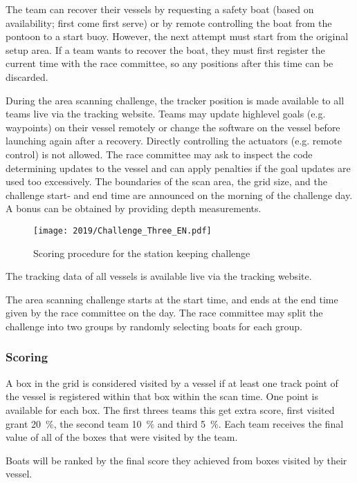 \documentclass[12pt]{article}
\begin{document}
The team can recover their vessels by requesting a safety boat (based on
availability; first come first serve) or by remote controlling the boat from the
pontoon to a start buoy. However, the next attempt must start from the original setup area.
If a team wants to recover the boat, they must first
register the current time with the race committee, so any positions after this
time can be discarded.

During the area scanning challenge, the tracker position is made available 
to all teams live via the tracking website. Teams may update 
highlevel goals (e.g. waypoints) on their vessel remotely or change the software
on the vessel before launching again after a recovery.
Directly controlling the
actuators (e.g. remote control) is not allowed. The race committee may ask to
inspect the code determining updates to the vessel and can apply penalties if
the goal updates are used too excessively.
The boundaries of the scan area, the grid size, and the challenge start- and end time
are announced on the morning of the challenge day.
A bonus can be obtained by providing depth measurements.

\begin{figure}[H]
  \centering
  \texttt{[image: 2019/Challenge\_Three\_EN.pdf]}
  \caption{Scoring procedure for the station keeping challenge}
  \label{fig:stationkeeping}
\end{figure}


The tracking data of all vessels is available live via the tracking website.

The area scanning challenge starts at the start time, and ends at the end
time given by the race committee on the day. The race committee may split the
challenge into two groups by randomly selecting boats for each group.

\subsubsection{Scoring}

A box in the grid is considered visited by a vessel if at least one track point
of the vessel is registered within that box within the scan time.
One point is available for each box. The first threes teams this get extra score, 
first visited grant 20~\%, the second team 10~\% and third 5~\%.
Each team receives the final value of all of the boxes that were visited by the
team. 

Boats will be ranked by the final score they achieved from boxes visited by
their vessel.
\end{document}

